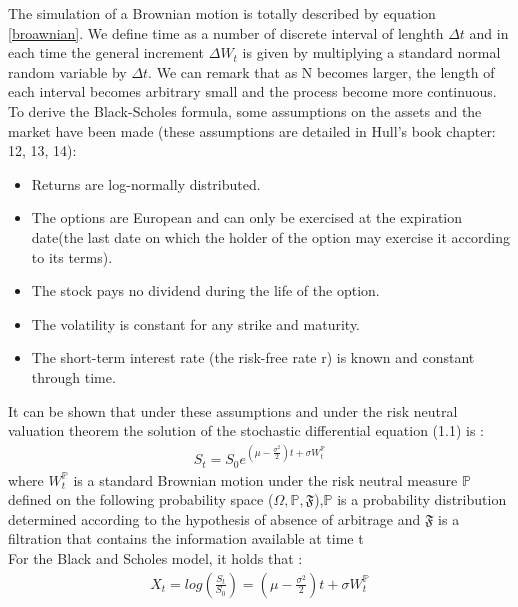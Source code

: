\documentclass[12pt]{report}
\begin{document}
The simulation of a Brownian motion is totally described by equation  \eqref{broawnian}. We define time as a number of discrete interval of lenghth $\Delta t$ and in each time the general increment $\Delta W_t$ is given by multiplying  a standard normal random variable by $\Delta t$. We can remark that as N becomes larger, the length of each interval becomes arbitrary small and the process become more continuous. \\


To derive the Black-Scholes formula, some assumptions on the assets and the market have been made (these assumptions are detailed in Hull's book chapter: 12, 13, 14):
\begin{itemize}
\item Returns are log-normally distributed.
\item The options are European and can only be exercised at the expiration date(the last date on which the holder of the option may exercise it according to its terms).
\item The stock pays no dividend during the life of the option.
\item The volatility is constant for any strike and maturity.
\item The short-term interest rate (the risk-free rate r) is known and constant through time.
\end{itemize} 


It can be shown that under these assumptions and under the risk neutral valuation theorem the solution of the stochastic differential equation (1.1) is :
\begin{gather}
S_t= S_0 e^{(\mu-\frac{\sigma^2}{2})t+\sigma W^{\mathbb{P}}_t}
\end{gather}
where $W_t^{\mathbb{P}}$ is a standard Brownian motion under the risk neutral measure $\mathbb{P}$  defined on the following probability space ($\Omega, \mathbb{P},\mathfrak{F}$),$\mathbb{P}$ is a probability distribution determined according to the hypothesis of absence of arbitrage and $\mathfrak{F}$ is a filtration that contains the information available at time t\\
For the Black and Scholes model, it holds that : 
\begin{gather}
X_t=log(\frac{S_t}{S_0})=(\mu-\frac{\sigma^2}{2})t+\sigma W^{\mathbb{P}}_t
\end{gather}
\end{document}
